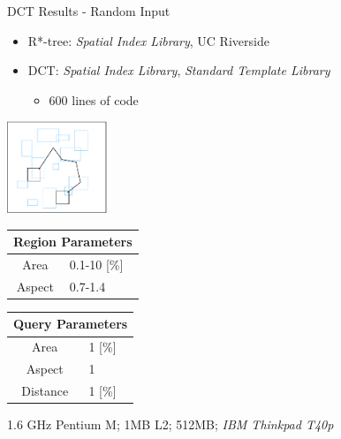 \documentclass[final,total,bgColor,slideColor,pdf,ps2pdf,default,noaccumulate]{prosper}
\begin{document}
\begin{slide}[R]{DCT Results - Random Input}
  \begin{itemize}
  \item R*-tree: \emph{Spatial Index Library}, UC Riverside
  \item DCT: \emph{Spatial Index Library}, \emph{Standard Template Library}
    \begin{itemize}
    \item 600 lines of code
    \end{itemize}
  \end{itemize}

  \begin{minipage}[c]{5cm}
    \centering
    \vspace{0pt}
    \includegraphics[width=3cm]{figs/random_tests.eps}%
  \end{minipage}
  \begin{minipage}[c]{5cm}
    \centering
    \begin{tabular}[t]{|cl|}
      \multicolumn{2}{c}{Region Parameters} \\
      \hline
      Area & 0.1-10 [\%] \\
      Aspect & 0.7-1.4 \\
      \hline
    \end{tabular}
    
    \begin{tabular}[t]{|cl|}
      \multicolumn{2}{c}{Query Parameters} \\
      \hline
      Area & 1 [\%]\\
      Aspect & 1 \\
      Distance & 1 [\%] \\
      \hline
    \end{tabular}
  \end{minipage}

\vspace{.5cm}
 \tiny 1.6 GHz Pentium M; 1MB L2; 512MB; \emph{IBM Thinkpad T40p}
 \end{slide}

\end{document}
